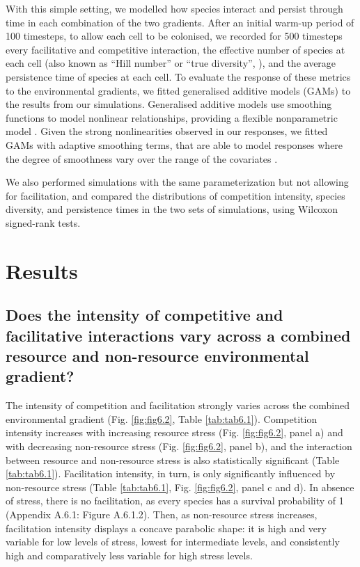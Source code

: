 With this simple setting, we modelled how species interact and persist through time in each combination of the two gradients. After an initial warm-up period of 100 timesteps, to allow each cell to be colonised, we recorded for 500 timesteps every facilitative and competitive interaction, the effective number of species at each cell (also known as “Hill number” or “true diversity”, \citealt{Tuomisto2012}), and the average persistence time of species at each cell. To evaluate the response of these metrics to the environmental gradients, we fitted generalised additive models (GAMs) to the results from our simulations. Generalised additive models use smoothing functions to model nonlinear relationships, providing a flexible nonparametric model \citep{Wood2017}. Given the strong nonlinearities observed in our responses, we fitted GAMs with adaptive smoothing terms, that are able to model responses where the degree of smoothness vary over the range of the covariates \citep{Wood2017}.

We also performed simulations with the same parameterization but not allowing for facilitation, and compared the distributions of competition intensity, species diversity, and persistence times in the two sets of simulations, using Wilcoxon signed-rank tests.

\section{Results}

\subsection*{Does the intensity of competitive and facilitative interactions vary across a combined resource and non-resource environmental gradient?}

The intensity of competition and facilitation strongly varies across the combined environmental gradient (Fig. \ref{fig:fig6.2}, Table \ref{tab:tab6.1}). Competition intensity increases with increasing resource stress (Fig. \ref{fig:fig6.2}, panel a) and with decreasing non-resource stress (Fig. \ref{fig:fig6.2}, panel b), and the interaction between resource and non-resource stress is also statistically significant (Table \ref{tab:tab6.1}). Facilitation intensity, in turn, is only significantly influenced by non-resource stress (Table \ref{tab:tab6.1}, Fig. \ref{fig:fig6.2}, panel c and d). In absence of stress, there is no facilitation, as every species has a survival probability of 1 (Appendix A.6.1: Figure A.6.1.2). Then, as non-resource stress increases, facilitation intensity displays a concave parabolic shape: it is high and very variable for low levels of stress, lowest for intermediate levels, and consistently high and comparatively less variable for high stress levels.

